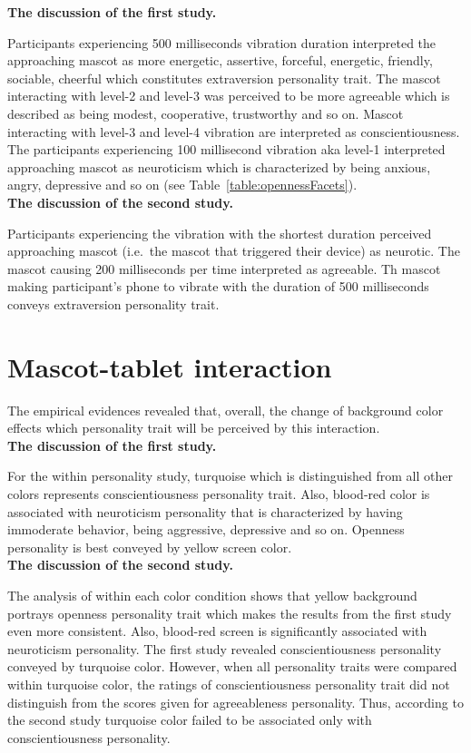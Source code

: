 \textbf{The discussion of the first study.}\par
Participants experiencing 500 milliseconds vibration duration interpreted the approaching mascot as more
energetic, assertive, forceful, energetic, friendly, sociable, cheerful which
constitutes extraversion personality trait.
The mascot interacting with level-2 and level-3 was perceived to be more agreeable which
is described as being modest, cooperative, trustworthy and so on.
Mascot interacting with level-3 and level-4 vibration are interpreted as conscientiousness.
The participants experiencing 100 millisecond vibration aka level-1 interpreted
approaching mascot as neuroticism which is characterized by being
anxious, angry, depressive and so on (see Table~\ref{table:opennessFacets}).\\

\textbf{The discussion of the second study.}\par
Participants experiencing the vibration with the shortest duration
perceived approaching mascot (i.e.\ the mascot that triggered their device) as neurotic.
The mascot causing 200 milliseconds per time interpreted as agreeable.
Th mascot making participant's phone to vibrate with the duration of 500
milliseconds conveys extraversion personality trait.\\

\section{Mascot-tablet interaction}
\label{sec:mascot-tablet-interaction}
The empirical evidences revealed that, overall, the change of background
color effects which personality trait will be perceived by this interaction.\\

\textbf{The discussion of the first study.}\par
For the within personality study, turquoise which is distinguished from all other
colors represents conscientiousness personality trait.
Also, blood-red color is associated with neuroticism personality that is characterized by
having immoderate behavior, being aggressive, depressive and so on.
Openness personality is best conveyed by yellow screen color.\\

\textbf{The discussion of the second study.}\par
The analysis of within each color condition shows that yellow background portrays openness
personality trait which makes the results from the first study even more consistent.
Also, blood-red screen is significantly associated with neuroticism personality.
The first study revealed conscientiousness personality conveyed by turquoise color.
However, when all personality traits were compared within turquoise color, the ratings
of conscientiousness personality trait did not distinguish from the scores given for
agreeableness personality.
Thus, according to the second study turquoise color failed to be associated only with conscientiousness personality.\\

